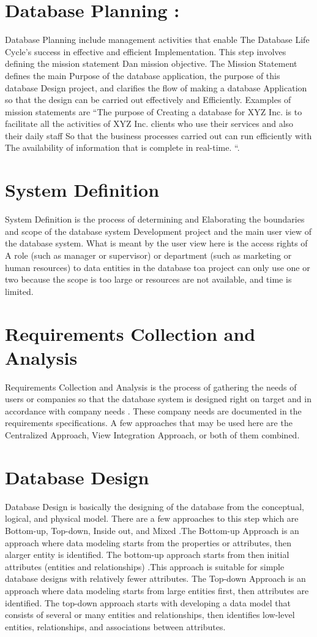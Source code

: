\documentclass[12pt,a4paper]{article}
\begin{document}
\section*{ Database Planning : }Database Planning include management activities that enable The Database Life Cycle’s success in effective and efficient Implementation. This step involves defining the mission statement Dan mission objective. The Mission Statement defines the main Purpose of the database application, the purpose of this database Design project, and clarifies the flow of making a database Application so that the design can be carried out effectively and Efficiently.
Examples of mission statements are “The purpose of Creating a database for XYZ Inc. is to facilitate all the activities of XYZ Inc. clients who use their services and also their daily staff So that the business processes carried out can run efficiently with The availability of information that is complete in real-time. “.
\section*{System Definition}System Definition is the process of determining and Elaborating the boundaries and scope of the database system Development project and the main user view of the database system.
What is meant by the user view here is the access rights of A role (such as manager or supervisor) or department (such as marketing or human resources) to data entities in the database toa project can only use one or two because the scope is too large or resources are not available, and time is limited.
\section*{Requirements Collection and Analysis}Requirements Collection and Analysis is the process of gathering the needs of users or companies so that the database system is designed right on target and in accordance with company needs .
These company needs are documented in the requirements specifications. A few approaches that may be used here are the Centralized Approach, View Integration Approach, or both of them combined.
\section*{Database Design}Database Design is basically the designing of the database from the conceptual, logical, and physical model. There are a few approaches to this step which are Bottom-up, Top-down, Inside out, and Mixed .The Bottom-up Approach is an approach where data modeling starts from the properties or attributes, then alarger entity is identified. The bottom-up approach starts from then initial attributes (entities and relationships) .This approach is suitable for simple database designs with  relatively fewer attributes. The Top-down Approach is an approach where data modeling starts from large entities first, then attributes are identified. 
The top-down approach starts with developing a data model that consists of several or many entities and relationships, then identifies low-level entities, relationships, and associations between attributes.
\end{document}
